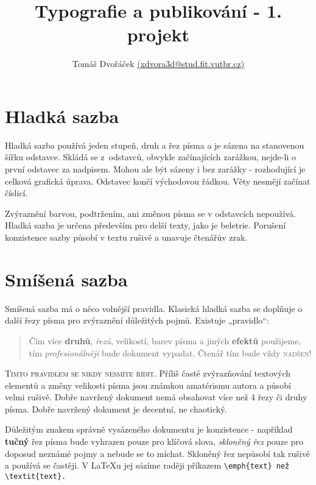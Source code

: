 \documentclass[twocolumn,a4paper,10pt]{article}
\title {Typografie a publikování - 1. projekt}
\author{Tomáš Dvořáček \href{mailto:xdvora3d@stud.fit.vutbr.cz}{(xdvora3d@stud.fit.vutbr.cz)}}
\date{}
\begin{document}
\maketitle


\section {Hladká sazba}

\noindent Hladká sazba používá jeden stupeň, druh a řez písma a je sázena na stanovenou šířku odstavce. Skládá se z~odstavců, obvykle začínajících zarážkou, nejde-li o první odstavec za nadpisem. Mohou ale být sázeny i bez zarážky - rozhodující je celková grafická úprava. Odstavec končí východovou řádkou. Věty nesmějí začínat číslicí.

Zvýraznění barvou, podtržením, ani změnou písma se v odstavcích nepoužívá. Hladká sazba je určena především pro delší texty, jako je beletrie. Porušení konzistence sazby působí v textu rušivě a unavuje čtenářův zrak.

\section{Smíšená sazba}

\noindent Smíšená sazba má o něco volnější pravidla. Klasická hladká sazba se doplňuje o další řezy písma pro zvýraznění důležitých pojmů. Existuje „pravidlo“:


\begin{quote}
    Čím více \textbf{druhů}, \textit{řezů}, {\footnotesize velikostí}, barev písma a jiných \textbf{\tiny efektů} použijeme, tím \textit{profesionálněji} bude dokument vypadat. Čtenář tím bude {\LARGE vždy} \textsc{\Huge nadšen!}
\end{quote}
    
\textsc{Tímto pravidlem se nikdy nesmíte řídit.} Příliš časté zvýrazňování textových elementů a změny velikosti písma jsou známkou amatérismu autora a působí velmi rušivě. Dobře navržený dokument nemá obsahovat více než
4 řezy či druhy písma. Dobře navržený dokument je decentní, ne chaotický.

Důležitým znakem správně vysázeného dokumentu je konzistence - například \textbf{tučný} řez písma bude vyhrazen pouze pro klíčová slova, \textit{skloněný řez}  pouze pro doposud neznámé pojmy a nebude se to míchat. Skloněný řez nepůsobí tak rušivě a používá se častěji. V \LaTeX u jej sázíme raději příkazem \verb|\emph{text} než \textit{text}.| 
\end{document}
